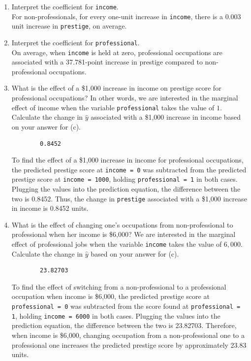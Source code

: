 \documentclass[12pt,letterpaper]{article}
\begin{document}
\begin{enumerate}
\newpage
	\item [(d)]
	Interpret the coefficient for \texttt{income}. \\[0.2cm]
	For non-professionals, for every one-unit increase in \texttt{income}, there is a 0.003 unit increase in \texttt{prestige}, on average. 
	\vspace{0.5cm}	
	\item [(e)]
	Interpret the coefficient for \texttt{professional}. \\[0.2cm]
	On average, when \texttt{income} is held at zero, professional occupations are associated with a 37.781-point increase in prestige compared to non-professional occupations.
	\vspace{0.5cm}	
	\item [(f)]
	What is the effect of a \$1,000 increase in income on prestige score for professional occupations? In other words, we are interested in the marginal effect of income when the variable \texttt{professional} takes the value of $1$. Calculate the change in $\hat{y}$ associated with a \$1,000 increase in income based on your answer for (c).
	
	\begin{verbatim}
		0.8452 
	\end{verbatim}
	To find the effect of a \$1,000 increase in income for professional occupations, the predicted prestige score at \texttt{income = 0} was subtracted from the predicted prestige score at \texttt{income = 1000}, holding \texttt{professional = 1} in both cases. Plugging the values into the prediction equation, the difference between the two is 0.8452. Thus, the change in \texttt{prestige} associated with a \$1,000 increase in income is 0.8452 units. 
	\vspace{0.5cm}
	\item [(g)]
	What is the effect of changing one's occupations from non-professional to professional when her income is \$6,000? We are interested in the marginal effect of professional jobs when the variable \texttt{income} takes the value of $6,000$. Calculate the change in $\hat{y}$ based on your answer for (c).
	
	\begin{verbatim}
		23.82703
	\end{verbatim}
	To find the effect of switching from a non-professional to a professional occupation when income is \$6,000, the predicted prestige score at \texttt{professional = 0} was subtracted from the score found at \texttt{professional = 1}, holding \texttt{income = 6000} in both cases. Plugging the values into the prediction equation, the difference between the two is 23.82703. Therefore, when income is \$6,000, changing occupation from a non-professional one to a professional one increases the predicted prestige score by approximately 23.83 units. 
\newpage
\end{enumerate}
\end{document}
